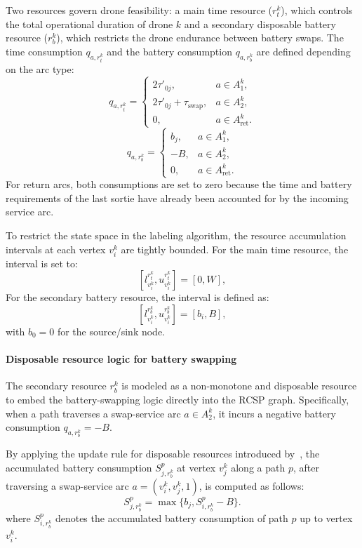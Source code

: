\documentclass[3p, authoryear, 11pt]{elsarticle}
\begin{document}
Two resources govern drone feasibility: a main time resource ($r_t^k$), which controls the total operational duration of drone $k$ and a secondary disposable battery resource ($r_b^k$), which restricts the drone endurance between battery swaps.
The time consumption $q_{a,r_t^k}$ and the battery consumption $q_{a,r_b^k}$ are defined depending on the arc type:
\[
q_{a,r_t^k} =
\begin{cases}
2\tau'_{0j}, & a\in A_1^k,\\[3pt]
2\tau'_{0j}+\tau_{\mathrm{swap}}, & a\in A_2^k,\\[3pt]
0, & a\in A_{\mathrm{ret}}^k.
\end{cases}
\]
\[
q_{a,r_b^k} =
\begin{cases}
b_j, & a\in A_1^k,\\[3pt]
-B, & a\in A_2^k,\\[3pt]
0, & a\in A_{\mathrm{ret}}^k.
\end{cases}
\]
For return arcs, both consumptions are set to zero because the time and battery requirements of the last sortie have already been accounted for by the incoming service arc.

To restrict the state space in the labeling algorithm, the resource accumulation intervals at each vertex $v_i^k$ are tightly bounded. For the main time resource, the interval is set to:
\[
[l_{v_i^k}^{r_t^k},u_{v_i^k}^{r_t^k}]=[0,W],
\]
For the secondary battery resource, the interval is defined as:
\[
[l_{v_i^k}^{r_b^k},u_{v_i^k}^{r_b^k}]=[b_i,B],
\]
with $b_0=0$ for the source/sink node.

\paragraph{Disposable resource logic for battery swapping}
The secondary resource $r_b^k$ is modeled as a non-monotone and disposable resource to embed the battery-swapping logic directly into the RCSP graph. Specifically, when a path traverses a swap-service arc $a\in A_2^k$, it incurs a negative battery consumption $q_{a,r_b^k}=-B$.

By applying the update rule for disposable resources introduced by~\citep{pessoa_generic_2020}, the accumulated battery consumption $S_{j,r_b^k}^p$ at vertex $v_j^k$ along a path $p$, after traversing a swap-service arc $a=(v_i^k,v_j^k,1)$, is computed as follows:
\begin{equation}
S_{j,r_b^k}^p = \max\{ b_j, S_{i,r_b^k}^p-B \}.
\label{eq:BP_swap_reset}
\end{equation}
where $S_{i,r_b^k}^p$ denotes the accumulated battery consumption of path $p$ up to vertex $v_i^k$.
\end{document}
